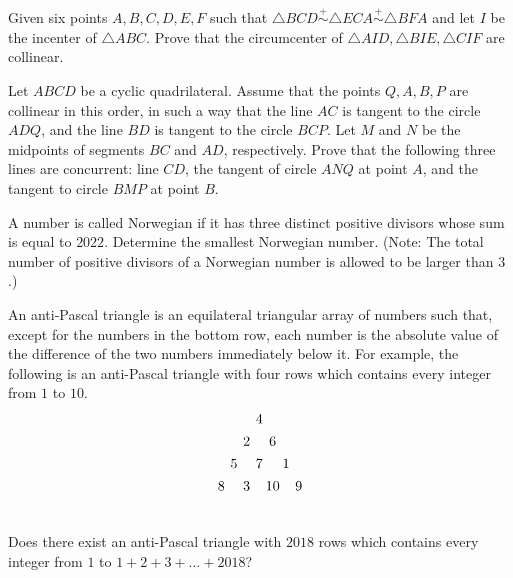 \documentclass[11pt]{scrartcl}
\begin{document}
\begin{problem}[902621191535073]
Given six points $ A, B, C, D, E, F $ such that $ \triangle BCD \stackrel{+}{\sim} \triangle ECA \stackrel{+}{\sim} \triangle BFA $ and let $ I $ be the incenter of $ \triangle ABC. $ Prove that the circumcenter of $ \triangle AID, \triangle BIE, \triangle CIF $ are collinear.
\end{problem}
\begin{problem}[6193947856984766386]
Let $ABCD$ be a cyclic quadrilateral. Assume that the points $Q, A, B, P$ are collinear in this order, in such a way that the line $AC$ is tangent to the circle $ADQ$, and the line $BD$ is tangent to the circle $BCP$. Let $M$ and $N$ be the midpoints of segments $BC$ and $AD$, respectively. Prove that the following three lines are concurrent: line $CD$, the tangent of circle $ANQ$ at point $A$, and the tangent to circle $BMP$ at point $B$.
\end{problem}
\begin{problem}[660403976209529]
A number is called Norwegian if it has three distinct positive divisors whose sum is equal to $2022$. Determine the smallest Norwegian number.
(Note: The total number of positive divisors of a Norwegian number is allowed to be larger than $3$.)
\end{problem}
\begin{problem}[7494618588207758150]
	An anti-Pascal triangle is an equilateral triangular array of numbers such that, except for the numbers in the bottom row, each number is the absolute value of the difference of the two numbers immediately below it. For example, the following is an anti-Pascal triangle with four rows which contains every integer from $1$ to $10$.
\[\begin{array}{
c@{\hspace{4pt}}c@{\hspace{4pt}}
c@{\hspace{4pt}}c@{\hspace{2pt}}c@{\hspace{2pt}}c@{\hspace{4pt}}c
} \vspace{4pt}
 & & & 4 & & &  \\\vspace{4pt}
 & & 2 & & 6 & &  \\\vspace{4pt}
 & 5 & & 7 & & 1 & \\\vspace{4pt}
 8 & & 3 & & 10 & & 9 \\\vspace{4pt}
\end{array}\]Does there exist an anti-Pascal triangle with $2018$ rows which contains every integer from $1$ to $1 + 2 + 3 + \dots + 2018$?

\end{problem}
\end{document}
